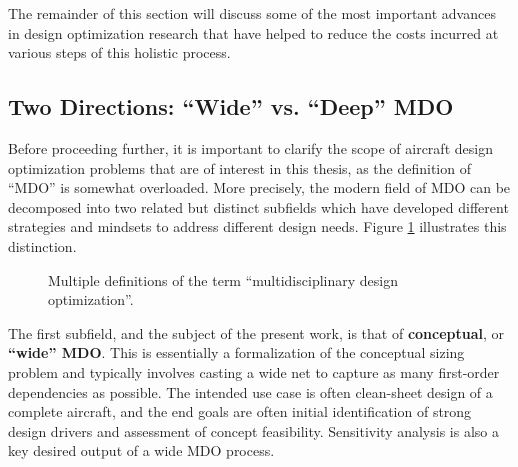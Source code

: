 \documentclass[12pt,vi,oneside]{report}
\begin{document}
    The remainder of this section will discuss some of the most important advances in design optimization research that have helped to reduce the costs incurred at various steps of this holistic process.

    \subsection{Two Directions: ``Wide'' vs. ``Deep'' MDO}
    \label{sec:wide_vs_deep}

    Before proceeding further, it is important to clarify the scope of aircraft design optimization problems that are of interest in this thesis, as the definition of ``MDO'' is somewhat overloaded. More precisely, the modern field of MDO can be decomposed into two related but distinct subfields which have developed different strategies and mindsets to address different design needs. Figure \ref{fig:mdo_overloaded_term} illustrates this distinction.

    \begin{figure}[h]
        \centering
        \caption{Multiple definitions of the term ``multidisciplinary design optimization''.}
        \label{fig:mdo_overloaded_term}
    \end{figure}

    The first subfield, and the subject of the present work, is that of \textbf{conceptual}, or \textbf{``wide'' MDO}. This is essentially a formalization of the conceptual sizing problem and typically involves casting a wide net to capture as many first-order dependencies as possible. The intended use case is often clean-sheet design of a complete aircraft, and the end goals are often initial identification of strong design drivers and assessment of concept feasibility. Sensitivity analysis is also a key desired output of a wide MDO process.
\end{document}
